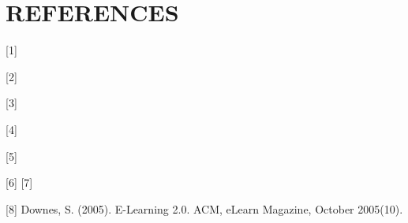 \chapter{REFERENCES}
[1]

[2] 

[3]

[4] 

[5]

[6] 
[7] 

 [8] Downes, S. (2005). E-Learning 2.0. ACM, eLearn Magazine, October 2005(10).\\
